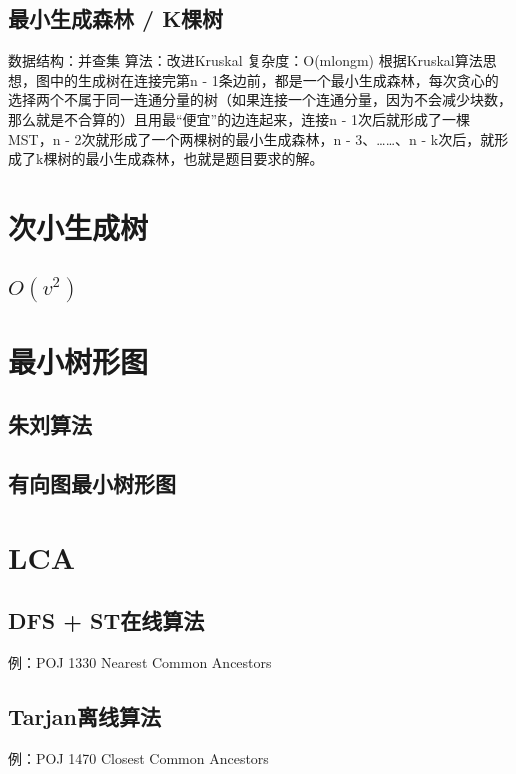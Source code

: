 \subsection{最小生成森林 / K棵树}
数据结构：并查集 算法：改进Kruskal 复杂度：O(mlongm) 
根据Kruskal算法思想，图中的生成树在连接完第n - 1条边前，都是一个最小生成森林，每次贪心的选择两个不属于同一连通分量的树（如果连接一个连通分量，因为不会减少块数，那么就是不合算的）且用最“便宜”的边连起来，连接n - 1次后就形成了一棵MST，n - 2次就形成了一个两棵树的最小生成森林，n - 3、……、n - k次后，就形成了k棵树的最小生成森林，也就是题目要求的解。


\section{次小生成树}
\subsection{$O(v^2)$}



\section{最小树形图}
\subsection{朱刘算法}


\subsection{有向图最小树形图}




\section{LCA}
\subsection{DFS + ST在线算法}
例：POJ 1330 Nearest Common Ancestors


\subsection{Tarjan离线算法}
例：POJ 1470 Closest Common Ancestors



